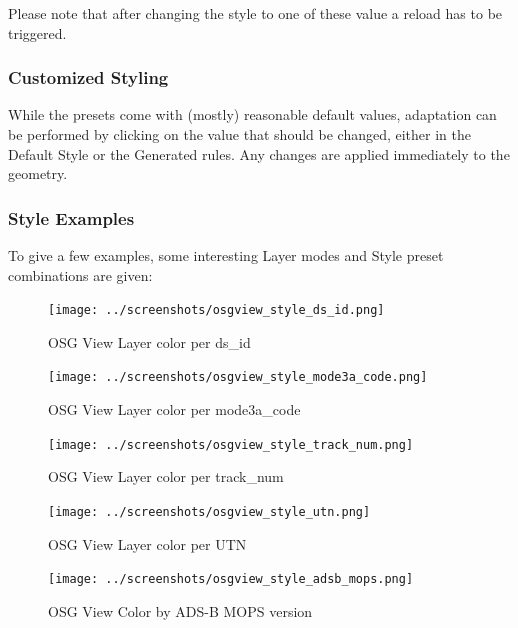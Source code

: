 Please note that after changing the style to one of these value a reload has to be triggered. \\

\subsubsection{Customized Styling}

While the presets come with (mostly) reasonable default values, adaptation can be performed by clicking on the value that should be changed, either in the Default Style or the Generated rules. Any changes are applied immediately to the geometry.

\subsubsection{Style Examples}

To give a few examples, some interesting Layer modes and Style preset combinations are given:

\begin{figure}[H]
    \hspace*{-2.5cm}
    \texttt{[image: ../screenshots/osgview\_style\_ds\_id.png]}
  \caption{OSG View Layer color per ds\_id}
\end{figure}

\begin{figure}[H]
    \hspace*{-2.5cm}
    \texttt{[image: ../screenshots/osgview\_style\_mode3a\_code.png]}
  \caption{OSG View Layer color per mode3a\_code}
\end{figure}

\begin{figure}[H]
    \hspace*{-2.5cm}
    \texttt{[image: ../screenshots/osgview\_style\_track\_num.png]}
  \caption{OSG View Layer color per track\_num}
\end{figure}

\begin{figure}[H]
    \hspace*{-2.5cm}
    \texttt{[image: ../screenshots/osgview\_style\_utn.png]}
  \caption{OSG View Layer color per UTN}
\end{figure}

\begin{figure}[H]
    \hspace*{-2.5cm}
    \texttt{[image: ../screenshots/osgview\_style\_adsb\_mops.png]}
  \caption{OSG View Color by ADS-B MOPS version}
\end{figure}

